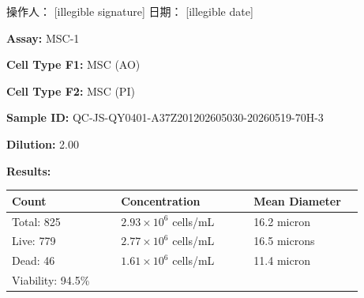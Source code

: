 \documentclass[UTF8,10pt,a4paper,fontset=fandol]{ctexart}
\newcommand{\fieldvalue}[1]{#1}
\newcommand{\handwritten}[1]{#1}
\begin{document}
\vfill

\noindent
操作人：
\fieldvalue{\handwritten{[illegible signature]}}
\hfill
日期：
\fieldvalue{\handwritten{[illegible date]}}

\newpage

\noindent\textbf{Assay:}%
\fieldvalue{MSC-1}

\medskip
\noindent\textbf{Cell Type F1:}%
\fieldvalue{MSC (AO)}

\medskip
\noindent\textbf{Cell Type F2:}%
\fieldvalue{MSC (PI)}

\medskip
\noindent\textbf{Sample ID:}%
\fieldvalue{QC-JS-QY0401-A37Z201202605030-20260519-70H-3}

\medskip
\noindent\textbf{Dilution:}%
\fieldvalue{2.00}

\bigskip
\noindent\textbf{Results:}

\medskip
\noindent
\begin{tabular}{@{}p{0.28\linewidth}p{0.34\linewidth}p{0.28\linewidth}@{}}
\textbf{Count} & \textbf{Concentration} & \textbf{Mean Diameter} \\
\hline
Total:
\fieldvalue{825}
&
\fieldvalue{$2.93\times10^{6}$ cells/mL}
&
\fieldvalue{16.2 micron}
\\[2pt]
Live:
\fieldvalue{779}
&
\fieldvalue{$2.77\times10^{6}$ cells/mL}
&
\fieldvalue{16.5 microns}
\\[2pt]
Dead:
\fieldvalue{46}
&
\fieldvalue{$1.61\times10^{6}$ cells/mL}
&
\fieldvalue{11.4 micron}
\\[2pt]
Viability:
\fieldvalue{94.5\%}
&
&
\end{tabular}
\end{document}
